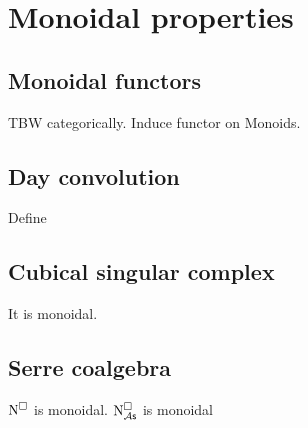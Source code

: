 
\section{Monoidal properties}

\subsection{Monoidal functors}

TBW categorically. Induce functor on Monoids.

\subsection{Day convolution} \label{ss:day convolution}

Define

\subsection{Cubical singular complex}

It is monoidal.



\subsection{Serre coalgebra}

$\operatorname{N^{\square}}$ is monoidal. $\operatorname{N^{\square}_{\mathcal{A}\mathsf{s}}}$ is monoidal


